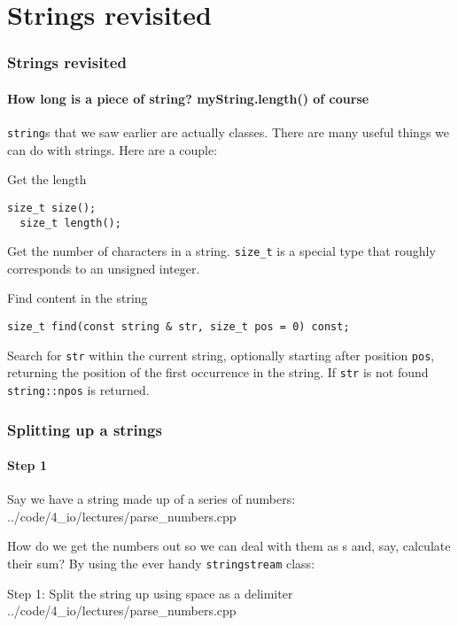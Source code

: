 \documentclass{beamer}
\begin{document}
\section{Strings revisited}

\begin{frame}[fragile]
  \frametitle{Strings revisited}
  \framesubtitle{How long is a piece of string? myString.length() of course}
  
  \texttt{string}s that we saw earlier are actually classes.  There are many useful things we can do with strings.  Here are a couple:
  \pause  
  \begin{block}{Get the length}
    \begin{lstlisting}[aboveskip=0pt]
  size_t size();
  size_t length();
    \end{lstlisting}
    Get the number of characters in a string.  \texttt{size\_t} is a special type that roughly corresponds to an unsigned integer.
  \end{block}
  \pause
  \begin{block}{Find content in the string}
    \begin{lstlisting}[aboveskip=0pt]
  size_t find(const string & str, size_t pos = 0) const;
    \end{lstlisting}
    Search for \texttt{str} within the current string, optionally starting after position \texttt{pos}, returning the position of the first occurrence in the string.  If \texttt{str} is not found \texttt{string::npos} is returned.
  \end{block}

\end{frame}

\begin{frame}[fragile]
  \frametitle{Splitting up a strings}
  \framesubtitle{Step 1}
  
  Say we have a string made up of a series of numbers:
  	{../code/4_io/lectures/parse_numbers.cpp}

  How do we get the numbers out so we can deal with them as s and, say, calculate their sum?\newline\pause
  By using the ever handy \texttt{stringstream} class:

  \begin{block}{Step 1: Split the string up using space as a delimiter}
  		{../code/4_io/lectures/parse_numbers.cpp}
	\end{block}

\end{frame}
\end{document}
